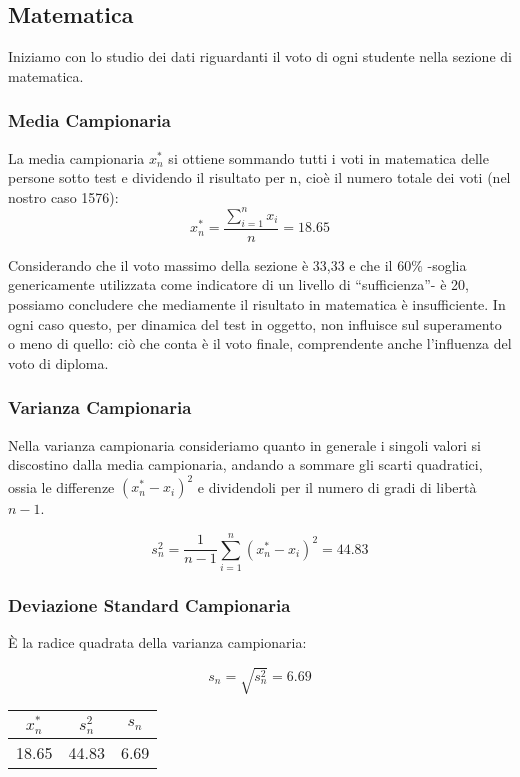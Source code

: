 \clearpage
\subsection{Matematica}

Iniziamo con lo studio dei dati riguardanti il voto di ogni studente nella
sezione di matematica.

\subsubsection{Media Campionaria}

La media campionaria \(x_{n}^{*}\) si ottiene sommando tutti i voti in matematica
delle persone sotto test e dividendo il risultato per n, cioè il numero totale
dei voti (nel nostro caso 1576): 
\[
x_{n}^{*} = \frac{\sum_{i=1}^{n} x_{i}}{n} = 18.65
\]

Considerando che il voto massimo della sezione è 33,33 e che il 60\% -soglia
genericamente utilizzata come indicatore di un livello di “sufficienza”- è 20,
possiamo concludere che mediamente il risultato in matematica è
insufficiente. In ogni caso questo, per dinamica del test in
oggetto, non influisce sul superamento o meno di quello: ciò che
conta è il voto finale, comprendente anche l’influenza del voto di
diploma.

\subsubsection{Varianza Campionaria}

Nella varianza campionaria consideriamo quanto in generale i singoli valori si
discostino dalla media campionaria, andando a sommare gli scarti quadratici,
ossia le differenze \((x_n^* - x_i)^2\) e dividendoli per il numero di gradi di
libertà \(n-1\).

\[
s_n^2 = \frac{1}{n-1} \sum_{i=1}^{n}(x_n^* - x_i)^2 = 44.83
\]

\subsubsection{Deviazione Standard Campionaria}

È la radice quadrata della varianza campionaria:

\[
s_n = \sqrt{s_n^2} = 6.69
\]
\clearpage
\thispagestyle{empty}

\begin{center}
\begin{tabular}{|c|c|c|}
  \hline
  \(x_{n}^{*}\) & \(s_n^2\) & \(s_n\) \\
  \hline
  18.65 & 44.83 & 6.69 \\
  \hline
\end{tabular}
\end{center}

